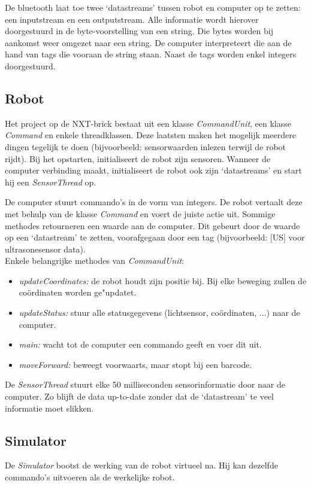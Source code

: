 \documentclass[eind]{penoverslag}
\begin{document}
De bluetooth laat toe twee `datastreams' tussen robot en computer op te zetten: een inputstream en een outputstream. Alle informatie wordt hierover doorgestuurd in de byte-voorstelling van een string. Die bytes worden bij aankomst weer omgezet naar een string. De computer interpreteert die aan de hand van tags die vooraan de string staan. Naast de tags worden enkel integers doorgestuurd.

\subsection{Robot} %
\label{ssec:robot}
Het project op de NXT-brick bestaat uit een klasse \textit{CommandUnit}, een klasse \textit{Command} en enkele threadklassen. Deze laatsten maken het mogelijk meerdere dingen tegelijk te doen (bijvoorbeeld: sensorwaarden inlezen terwijl de robot rijdt). Bij het opstarten, initialiseert de robot zijn sensoren. Wanneer de computer verbinding maakt, initialiseert de robot ook zijn `datastreams' en start hij een \textit{SensorThread} op.

De computer stuurt commando's in de vorm van integers. De robot vertaalt deze met behulp van de klasse \textit{Command} en voert de juiste actie uit. Sommige methodes retourneren een waarde aan de computer. Dit gebeurt door de waarde op een `datastream' te zetten, voorafgegaan door een tag (bijvoorbeeld: [US] voor ultrasonesensor data).\\

Enkele belangrijke methodes van \textit{CommandUnit}:
\begin{itemize}
\item \textit{updateCoordinates:} de robot houdt zijn positie bij. Bij elke beweging zullen de co\"ordinaten worden ge"updatet.
\item \textit{updateStatus:} stuur alle statusgegevens (lichtsensor, co\"ordinaten, ...) naar de computer.
\item \textit{main:} wacht tot de computer een commando geeft en voer dit uit.
\item \textit{moveForward:} beweegt voorwaarts, maar stopt bij een barcode.
\end{itemize}

De \textit{SensorThread} stuurt elke 50 milliseconden sensorinformatie door naar de computer. Zo blijft de data up-to-date zonder dat de `datastream' te veel informatie moet slikken.

\subsection{Simulator} %
\label{ssec:simulator}
De \textit{Simulator} bootst de werking van de robot virtueel na. Hij kan dezelfde commando's uitvoeren als de werkelijke robot.
\end{document}
